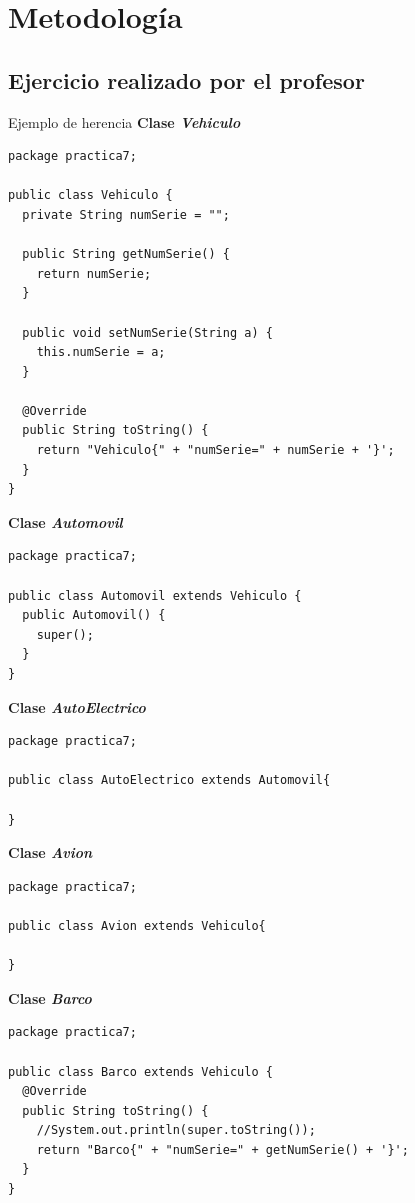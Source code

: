 \documentclass[11pt, twocolumn]{article}
\begin{document}
  \section*{Metodología} 
  \subsection*{Ejercicio realizado por el profesor}
  Ejemplo de herencia
  \textbf{Clase \textit{Vehiculo}} 
  \begin{lstlisting}
package practica7;

public class Vehiculo {
  private String numSerie = "";

  public String getNumSerie() {
    return numSerie;
  }

  public void setNumSerie(String a) {
    this.numSerie = a;
  }

  @Override
  public String toString() {
    return "Vehiculo{" + "numSerie=" + numSerie + '}';
  }
}
  \end{lstlisting}

  \textbf{Clase \textit{Automovil}}
  \begin{lstlisting}
package practica7;

public class Automovil extends Vehiculo {
  public Automovil() {
    super();
  }
}
  \end{lstlisting}

  \textbf{Clase \textit{AutoElectrico}}
  \begin{lstlisting}
package practica7;

public class AutoElectrico extends Automovil{
    
}
  \end{lstlisting}

  \textbf{Clase \textit{Avion}}
  \begin{lstlisting}
package practica7;

public class Avion extends Vehiculo{
      
}
  \end{lstlisting}

  \textbf{Clase \textit{Barco}}
  \begin{lstlisting}
package practica7;

public class Barco extends Vehiculo {
  @Override
  public String toString() {
    //System.out.println(super.toString());
    return "Barco{" + "numSerie=" + getNumSerie() + '}';
  }
}
  \end{lstlisting}
\end{document}
